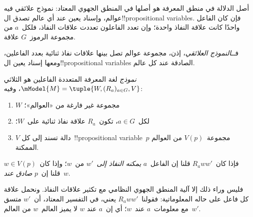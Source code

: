 \documentclass[../../../include/open-logic-section]{subfiles}
\begin{document}


أصل الدلالة في منطق المعرفة هو أصلها في المنطق الجهوي المعتاد: نموذج
علائقي فيه عوالم، وإسناد يعين عند أي عالم تصدق ال!!{propositional variable}s.
فإن كان الفاعل واحدًا كانت علاقة النفاذ واحدة؛ وإن تعدد الفاعلون تعددت
علاقات النفاذ، فلكل~$a$ من مجموعة الرموز~$G$ علاقة.

فــ\emph{النموذج العلائقي}، إذن، مجموعة عوالم تصل بينها علاقات نفاذ
ثنائية بعدد الفاعلين، ومعها إسناد يعين ال!!{propositional variable}s
الصادقة عند كل عالم.

\begin{defn}
  \emph{نموذج} لغة المعرفة المتعددة الفاعلين هو الثلاثي
  $\mModel{M}=\tuple{W,(R_a)_{a \in G},V}$، وفيه:
  \begin{enumerate}
  \item $W$ مجموعة غير فارغة من «العوالم»؛
  \item لكل~$a \in G$، تكون~${R}_a$ علاقة نفاذ ثنائية على~$W$؛
  \item $V$ دالة تسند إلى كل~!!{propositional
    variable}~$p$ مجموعة~$V(p)$ من العوالم الممكنة.
  \end{enumerate}
  فإذا كان~$R_a ww'$ قلنا إن الفاعل~$a$ \emph{يمكنه النفاذ إلى}~$w'$
  من~$w$؛ وإذا كان~$w \in V(p)$ قلنا إن~$p$ \emph{صادق عند}~$w$.
\end{defn}

فليس وراء ذلك إلا آلية المنطق الجهوي النظامي مع تكثير علاقات النفاذ.
ونحمل علاقة كل فاعل على حاله المعلوماتية: فقولنا~$R_a ww'$ يعني، في
التفسير المعتاد، أن~$w'$ متسق مع معلومات~$a$ عند~$w$؛ أي إن~$a$ عند
$w$ لا يميز العالم~$w$ من العالم~$w'$.
\end{document}

